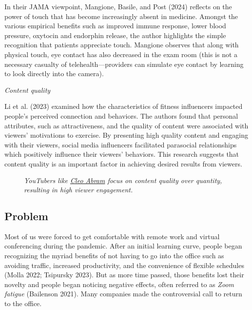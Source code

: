 \documentclass[
  letterpaper,
  DIV=11,
  numbers=noendperiod,
  oneside]{scrartcl}
\makeatletter
\newcommand*\pandocbounded[1]{%
  \sbox\pandoc@box{#1}%
  \Gscale@div\@tempa{\textheight}{\dimexpr\ht\pandoc@box+\dp\pandoc@box\relax}%
  \Gscale@div\@tempb{\linewidth}{\wd\pandoc@box}%
  \ifdim\@tempb\p@<\@tempa\p@\let\@tempa\@tempb\fi%
  \ifdim\@tempa\p@<\p@\scalebox{\@tempa}{\usebox\pandoc@box}%
  \else\usebox{\pandoc@box}%
  \fi%
}
\makeatother
\begin{document}
In their JAMA viewpoint, Mangione, Basile, and Post (2024) reflects on
the power of touch that has become increasingly absent in medicine.
Amongst the various empirical benefits such as improved immune response,
lower blood pressure, oxytocin and endorphin release, the author
highlights the simple recognition that patients appreciate touch.
Mangione observes that along with physical touch, eye contact has also
decreased in the exam room (this is not a necessary casualty of
telehealth---providers can simulate eye contact by learning to look
directly into the camera).

\emph{Content quality}

Li et al. (2023) examined how the characteristics of fitness influencers
impacted people's perceived connection and behaviors. The authors found
that personal attributes, such as attractiveness, and the quality of
content were associated with viewers' motivations to exercise. By
presenting high quality content and engaging with their viewers, social
media influencers facilitated parasocial relationships which positively
influence their viewers' behaviors. This research suggests that content
quality is an important factor in achieving desired results from
viewers.

\begin{figure}[H]

{\centering \pandocbounded{\texttt{[image: 3 CleoAbram.png]}}

}

\caption{\emph{YouTubers like \href{https://youtube.com/@cleoabram}{Cleo
Abram} focus on content quality over quantity, resulting in high viewer
engagement.}}

\end{figure}%

\subsection{Problem}\label{problem}

Most of us were forced to get comfortable with remote work and virtual
conferencing during the pandemic. After an initial learning curve,
people began recognizing the myriad benefits of not having to go into
the office such as avoiding traffic, increased productivity, and the
convenience of flexible schedules (Molla 2022; Tsipursky 2023). But as
more time passed, those benefits lost their novelty and people began
noticing negative effects, often referred to as \emph{Zoom fatigue}
(Bailenson 2021). Many companies made the controversial call to return
to the office.
\end{document}
